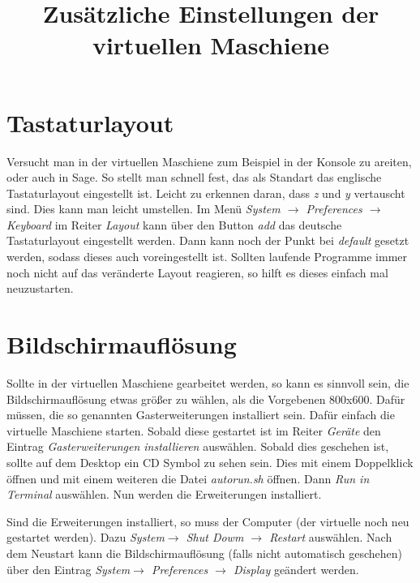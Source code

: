 \documentclass[a4paper,10pt]{article}
\title{Zusätzliche Einstellungen der virtuellen Maschiene}
\begin{document}
\maketitle
\section{Tastaturlayout}
Versucht man in der virtuellen Maschiene zum Beispiel in der Konsole zu areiten, oder auch in Sage. So stellt man schnell fest, 
das als Standart das englische Tastaturlayout eingestellt ist. Leicht zu erkennen daran, dass \emph{z} und \emph{y} vertauscht sind.
Dies kann man leicht umstellen. Im Menü \emph{System $\rightarrow$ Preferences $\rightarrow$ Keyboard} im Reiter \emph{Layout} kann 
über den Button \emph{add} das deutsche Tastaturlayout eingestellt werden. Dann kann noch der Punkt bei \emph{default} gesetzt werden,
sodass dieses auch voreingestellt ist. Sollten laufende Programme immer noch nicht auf das veränderte Layout reagieren, so hilft es 
dieses einfach mal neuzustarten. 
\section{Bildschirmauflösung}
Sollte in der virtuellen Maschiene gearbeitet werden, so kann es sinnvoll sein, die Bildschirmauflösung etwas größer zu wählen, als
die Vorgebenen 800x600. Dafür müssen, die so genannten Gasterweiterungen installiert sein. Dafür einfach die virtuelle Maschiene
starten. Sobald diese gestartet ist im Reiter \emph{Geräte} den Eintrag \emph{Gasterweiterungen installieren} auswählen.
Sobald dies geschehen ist, sollte auf dem Desktop ein CD Symbol zu sehen sein. Dies mit einem Doppelklick öffnen und mit einem weiteren
die Datei \emph{autorun.sh} öffnen. Dann \emph{Run in Terminal} auswählen. Nun werden die Erweiterungen installiert.

Sind die Erweiterungen installiert, so muss der Computer (der virtuelle noch neu gestartet werden). Dazu 
\emph{System$\rightarrow$ Shut Dowm $\rightarrow$ Restart}
auswählen. Nach dem Neustart kann die Bildschirmauflösung (falls nicht automatisch geschehen) über den Eintrag 
\emph{System$\rightarrow$ Preferences $\rightarrow$ Display} geändert werden. 
\end{document}
